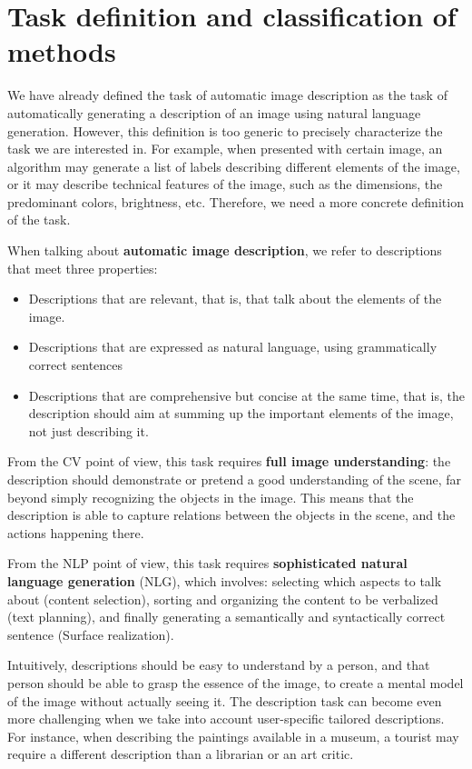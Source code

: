 \section{Task definition and classification of methods}\label{sec:task-definition}

We have already defined the task of automatic image description as the task of automatically generating a description of an image using natural language generation. However, this definition is too generic to precisely characterize the task we are interested in. For example, when presented with certain image, an algorithm may generate a list of labels describing different elements of the image, or it may describe technical features of the image, such as the dimensions, the predominant colors, brightness, etc. Therefore, we need a more concrete definition of the task.

When talking about \textbf{automatic image description}, we refer to descriptions that meet three properties:
\begin{itemize}
\item Descriptions that are relevant, that is, that talk about the elements of the image.
\item Descriptions that are expressed as natural language, using grammatically correct sentences
\item Descriptions that are comprehensive but concise at the same time, that is, the description should aim at summing up the important elements of the image, not just describing it.
\end{itemize}

From the CV point of view, this task requires \textbf{full image understanding}: the description should demonstrate or pretend a good understanding of the scene, far beyond simply recognizing the objects in the image. This means that the description is able to capture relations between the objects in the scene, and the actions happening there.

From the NLP point of view, this task requires \textbf{sophisticated natural language generation} (NLG), which involves: selecting which aspects to talk about (content selection), sorting and organizing the content to be verbalized (text planning), and finally generating a semantically and syntactically correct sentence (Surface realization).

Intuitively, descriptions should be easy to understand by a person, and that person should be able to grasp the essence of the image, to create a mental model of the image without actually seeing it. The description task can become even more challenging when we take into account user-specific tailored descriptions. For instance, when describing the paintings available in a museum, a tourist may require a different description than a librarian or an art critic.

